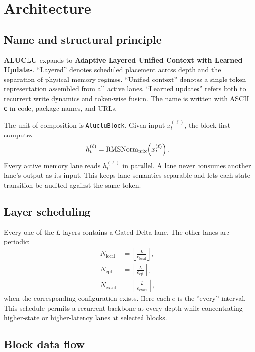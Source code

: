 \section{Architecture}
\label{sec:architecture}

\subsection{Name and structural principle}

\textbf{ALUCLU} expands to \textbf{Adaptive Layered Unified Context with
Learned Updates}. ``Layered'' denotes scheduled placement across depth and the
separation of physical memory regimes. ``Unified context'' denotes a single
token representation assembled from all active lanes. ``Learned updates''
refers both to recurrent write dynamics and token-wise fusion. The name is
written with ASCII \texttt{C} in code, package names, and URLs.

The unit of composition is \texttt{AlucluBlock}. Given input \(x_t^{(\ell)}\),
the block first computes
\begin{equation}
  h_t^{(\ell)}=\operatorname{RMSNorm}_{\mathrm{mix}}\!\left(x_t^{(\ell)}\right).
\end{equation}
Every active memory lane reads \(h_t^{(\ell)}\) in parallel. A lane never
consumes another lane's output as its input. This keeps lane semantics
separable and lets each state transition be audited against the same token.

\subsection{Layer scheduling}

Every one of the \(L\) layers contains a Gated Delta lane. The other lanes are
periodic:
\begin{align}
  N_{\mathrm{local}}
  &=\left\lfloor\frac{L}{e_{\mathrm{local}}}\right\rfloor,\\
  N_{\mathrm{epi}}
  &=\left\lfloor\frac{L}{e_{\mathrm{epi}}}\right\rfloor,\\
  N_{\mathrm{exact}}
  &=\left\lfloor\frac{L}{e_{\mathrm{exact}}}\right\rfloor,
  \label{eq:branch-counts}
\end{align}
when the corresponding configuration exists. Here each \(e\) is the
``every'' interval. This schedule permits a recurrent backbone at every depth
while concentrating higher-state or higher-latency lanes at selected blocks.

\subsection{Block data flow}


